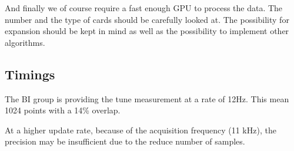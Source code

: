 And finally we of course require a fast enough GPU to process the data. The number and the type of cards should be carefully looked at. The possibility for expansion should be kept in mind as well as the possibility to implement other algorithms.

\subsection{Timings}

The \gls{BI} group is providing the tune measurement at a rate of 12Hz. This mean 1024 points with a 14\% overlap. 

At a higher update rate, because of the acquisition frequency (11 kHz), the precision may be insufficient due to the reduce number of samples.